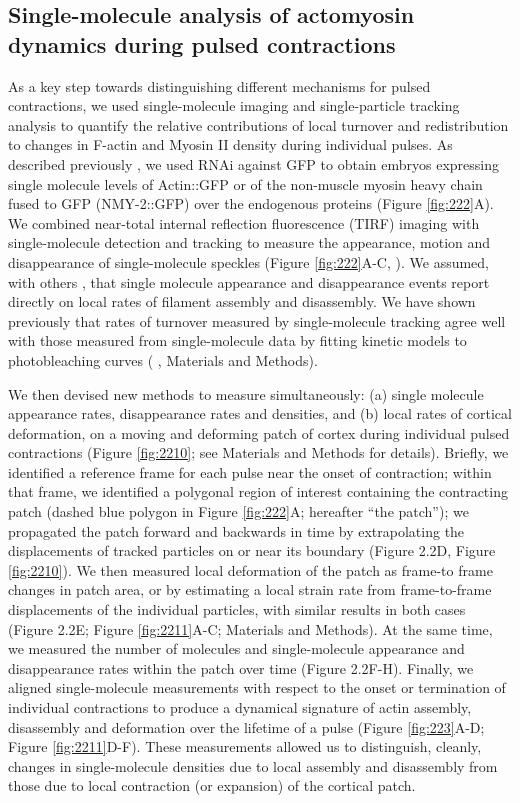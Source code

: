 \subsection{Single-molecule analysis of actomyosin dynamics during pulsed contractions}
As a key step towards distinguishing different mechanisms for pulsed contractions, we used single-molecule imaging and single-particle tracking analysis to quantify the relative contributions of local turnover and redistribution to changes in F-actin and Myosin II density during individual pulses. As described previously  \cite{Robin:2014jf}, we used RNAi against GFP to obtain embryos expressing single molecule levels of Actin::GFP or of the non-muscle myosin heavy chain fused to GFP (NMY-2::GFP) over the endogenous proteins (Figure \ref{fig:222}A). We combined near-total internal reflection fluorescence (TIRF) imaging with single-molecule detection and tracking to measure the appearance, motion and disappearance of single-molecule speckles (Figure \ref{fig:222}A-C,  \cite{Robin:2014jf}). We assumed, with others  \cite{Watanabe:2002jb, Vallotton:2004kz}, that single molecule appearance and disappearance events report directly on local rates of filament assembly and disassembly.  We have shown previously that rates of turnover measured by single-molecule tracking agree well with those measured from single-molecule data by fitting kinetic models to photobleaching curves  ( \cite{Robin:2014jf}, Materials and Methods).

We then devised new methods to measure simultaneously: (a) single molecule appearance rates, disappearance rates and densities, and (b) local rates of cortical deformation, on a moving and deforming patch of cortex during individual pulsed contractions (Figure \ref{fig:2210}; see Materials and Methods for details). Briefly, we identified a reference frame for each pulse near the onset of contraction; within that frame, we identified a polygonal region of interest containing the contracting patch (dashed blue polygon in Figure \ref{fig:222}A; hereafter ``the patch''); we propagated the patch forward and backwards in time by extrapolating the displacements of tracked particles on or near its boundary (Figure 2.2D, Figure \ref{fig:2210}).   We then measured local deformation of the patch as frame-to frame changes in patch area, or by estimating a local strain rate from frame-to-frame displacements of the individual particles, with similar results in both cases (Figure 2.2E; Figure \ref{fig:2211}A-C; Materials and Methods).  At the same time, we measured the number of molecules and single-molecule appearance and disappearance rates within the patch over time (Figure 2.2F-H). Finally, we aligned single-molecule measurements with respect to the onset or termination of individual contractions to produce a dynamical signature of actin assembly, disassembly and deformation over the lifetime of a pulse (Figure \ref{fig:223}A-D; Figure \ref{fig:2211}D-F). These measurements allowed us to distinguish, cleanly, changes in single-molecule densities due to local assembly and disassembly from those due to local contraction (or expansion) of the cortical patch.


